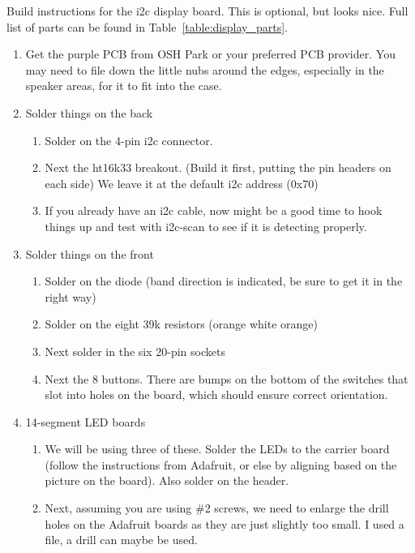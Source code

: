 \documentclass[11pt]{article}
\begin{document}
Build instructions for the i2c display board.
This is optional, but looks nice.
Full list of parts can be found in Table~\ref{table:display_parts}.

\begin{enumerate}
\item	Get the purple PCB from OSH Park or your preferred PCB provider.
	You may need to file down the little nubs around the edges, especially in the 
	speaker areas, for it to fit into the case.

\item Solder things on the back
	\begin{enumerate}
		\item	Solder on the 4-pin i2c connector.
		\item	Next the ht16k33 breakout.  (Build it first, putting the pin
			headers on each side)  We leave it at the default i2c address (0x70)
		\item	If you already have an i2c cable, now might be a good time to hook 
			things up and test with i2c-scan to see if it is detecting properly.
	\end{enumerate}

\item Solder things on the front
	\begin{enumerate}
	\item	Solder on the diode (band direction is indicated, be sure to get it in
		the right way)
	\item	Solder on the eight 39k resistors (orange white orange)
	\item	Next solder in the six 20-pin sockets
	\item	Next the 8 buttons.
		There are bumps on the bottom of the
		switches that slot into holes on the board, which should
		ensure correct orientation.
	\end{enumerate}

\item 14-segment LED boards

	\begin{enumerate}

		\item	We will be using three of these.
			Solder the LEDs to the carrier board (follow
			the instructions from Adafruit, or else by
			aligning based on the picture on the board).
			Also solder on the header.

		\item  Next, assuming you are using \#2 screws,
			we need to enlarge the
			drill holes on the Adafruit boards as they are
			just slightly too
			small.  I used a file, a drill can maybe be used.


\end{enumerate}
\end{enumerate}
\end{document}
